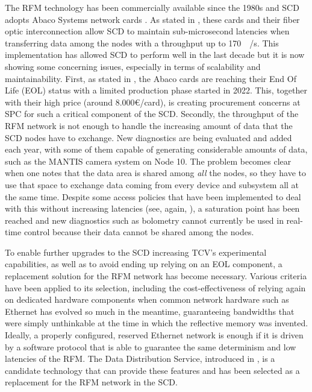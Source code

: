 The RFM technology has been commercially available since the 1980s and SCD adopts Abaco Systems network cards \cite{abaco_systems_pcie-5565rc_nodate}. As stated in , these cards and their fiber optic interconnection allow SCD to maintain sub-microsecond latencies when transferring data among the nodes with a throughput up to \SI{170}{\mega\byte/\second}. This implementation has allowed SCD to perform well in the last decade but it is now showing some concerning issues, especially in terms of scalability and maintainability. First, as stated in \cite{abaco_systems_pcie-5565rc_nodate}, the Abaco cards are reaching their End Of Life (EOL) status with a limited production phase started in 2022. This, together with their high price (around 8.000€/card), is creating procurement concerns at SPC for such a critical component of the SCD. Secondly, the throughput of the RFM network is not enough to handle the increasing amount of data that the SCD nodes have to exchange. New diagnostics are being evaluated and added each year, with some of them capable of generating considerable amounts of data, such as the MANTIS camera system on Node 10. The problem becomes clear when one notes that the data area is shared among \emph{all} the nodes, so they have to use that space to exchange data coming from every device and subsystem all at the same time. Despite some access policies that have been implemented to deal with this without increasing latencies (see, again, \cite{galperti_overview_2024}), a saturation point has been reached and new diagnostics such as bolometry cannot currently be used in real-time control because their data cannot be shared among the nodes.

To enable further upgrades to the SCD increasing TCV's experimental capabilities, as well as to avoid ending up relying on an EOL component, a replacement solution for the RFM network has become necessary. Various criteria have been applied to its selection, including the cost-effectiveness of relying again on dedicated hardware components when common network hardware such as Ethernet has evolved so much in the meantime, guaranteeing bandwidths that were simply unthinkable at the time in which the reflective memory was invented. Ideally, a properly configured, reserved Ethernet network is enough if it is driven by a software protocol that is able to guarantee the same determinism and low latencies of the RFM. The Data Distribution Service, introduced in , is a candidate technology that can provide these features and has been selected as a replacement for the RFM network in the SCD.

